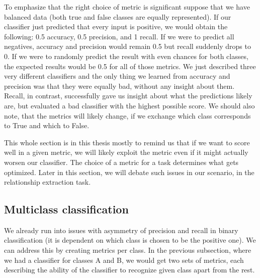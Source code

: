 


To emphasize that the right choice of metric is significant suppose that we have balanced data (both true and false classes are equally represented). If our classifier just predicted that every input is positive, we would obtain the following: 0.5 accuracy, 0.5 precision, and 1 recall. If we were to predict all negatives, accuracy and precision would remain 0.5 but recall suddenly drops to 0. If we were to randomly predict the result with even chances for both classes, the expected results would be 0.5 for all of those metrics. We just described three very different classifiers and the only thing we learned from accuracy and precision was that they were equally bad, without any insight about them. Recall, in contrast, successfully gave us insight about what the predictions likely are, but evaluated a bad classifier with the highest possible score. We should also note, that the metrics will likely change, if we exchange which class corresponds to True and which to False. 

This whole section is in this thesis mostly to remind us that if we want to score well in a given metric, we will likely exploit the metric even if it might actually worsen our classifier. The choice of a metric for a task determines what gets optimized. Later in this section, we will debate such issues in our scenario, in the relationship extraction task.





\subsection{Multiclass classification}


We already run into issues with asymmetry of precision and recall in binary classification (it is dependent on which class is chosen to be the positive one). We can address this by creating metrics per class. In the previous subsection, where we had a classifier for classes A and B, we would get two sets of metrics, each describing the ability of the classifier to recognize given class apart from the rest.

